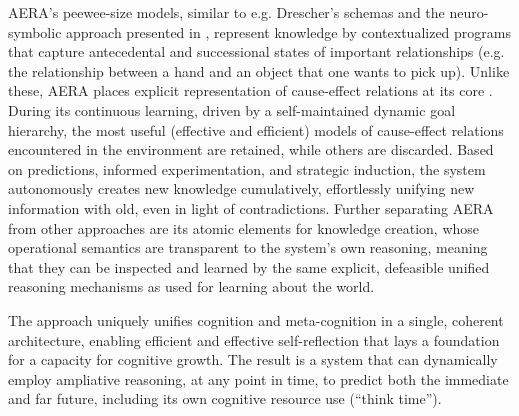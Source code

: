 \documentclass[runningheads]{llncs}
\begin{document}
AERA’s peewee-size models, similar to e.g. Drescher’s \cite{drescher_made-up_1991} schemas and the neuro-symbolic approach presented in \cite{komrusch_symbolic_2022}, represent knowledge by contextualized programs that capture antecedental and successional states of important relationships (e.g. the relationship between a hand and an object that one wants to pick up). Unlike these, AERA places explicit representation of cause-effect relations at its core \cite{thorisson2018cumulative}. During its continuous learning, driven by a self-maintained dynamic goal hierarchy, the most useful (effective and efficient) models of cause-effect relations encountered in the environment are retained, while others are discarded. Based on predictions, informed experimentation, and strategic induction, the system autonomously creates new knowledge cumulatively, effortlessly unifying new information with old, even in light of contradictions. Further separating AERA from other approaches are its atomic elements for knowledge creation, whose operational semantics are transparent to the system’s own reasoning, meaning that they can be inspected and learned by the same explicit, defeasible unified reasoning mechanisms as used for learning about the world. 

The approach uniquely unifies cognition and meta-cognition in a single, coherent architecture, enabling efficient and effective self-reflection that lays a foundation for a capacity for cognitive growth. The result is a system that can dynamically employ ampliative reasoning, at any point in time, to predict both the immediate and far future, including its own cognitive resource use (“think time”). 
\end{document}
